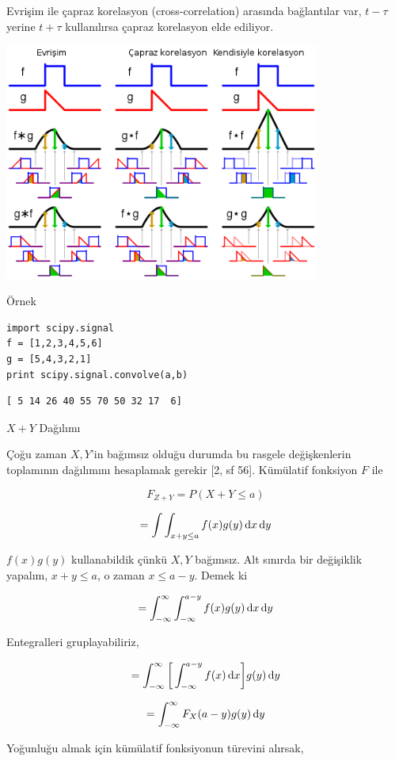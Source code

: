 \documentclass[12pt,fleqn]{article}\usepackage{../../common}
\begin{document}
Evrişim ile çapraz korelasyon (cross-correlation) arasında bağlantılar var,
$t-\tau$ yerine $t+\tau$ kullanılırsa çapraz korelasyon elde ediliyor.

\includegraphics[width=28em]{compar.png}

Örnek

\begin{verbatim}
import scipy.signal
f = [1,2,3,4,5,6]
g = [5,4,3,2,1]
print scipy.signal.convolve(a,b)
\end{verbatim}

\begin{verbatim}
[ 5 14 26 40 55 70 50 32 17  6]
\end{verbatim}

$X+Y$ Dağılımı

Çoğu zaman $X,Y$'in bağımsız olduğu durumda bu rasgele değişkenlerin
toplamının dağılımını hesaplamak gerekir [2, sf 56]. Kümülatif fonksiyon
$F$ ile

$$ F_{Z+Y} = P(X+Y \le a) $$

$$ = \int \int_{x+y \le a}^{} f(x)g(y) \,\mathrm{d} x \,\mathrm{d} y $$

$f(x)g(y)$ kullanabildik çünkü $X,Y$ bağımsız. Alt sınırda bir değişiklik
yapalım, $x+y \le a$, o zaman $x \le a-y$. Demek ki

$$
= \int_{-\infty}^{\infty} \int_{-\infty}^{a-y} f(x)g(y) \,\mathrm{d} x \,\mathrm{d} y
$$

Entegralleri gruplayabiliriz, 

$$
= \int_{-\infty}^{\infty}
\bigg[ \int_{-\infty}^{a-y} f(x) \,\mathrm{d} x \bigg] g(y) \,\mathrm{d} y
$$

$$ = \int_{-\infty}^{\infty} F_X(a-y) g(y) \,\mathrm{d} y $$

Yoğunluğu almak için kümülatif fonksiyonun türevini alırsak, 
\end{document}
